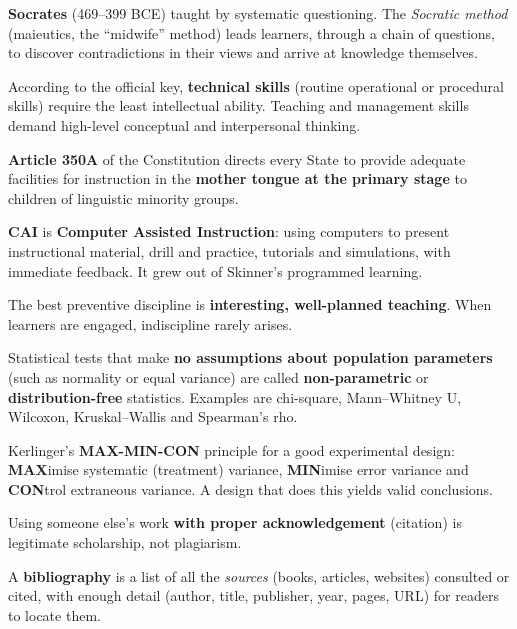 \textbf{Socrates} (469--399 BCE) taught by systematic questioning. The \emph{Socratic method} (maieutics, the ``midwife'' method) leads learners, through a chain of questions, to discover contradictions in their views and arrive at knowledge themselves.

According to the official key, \textbf{technical skills} (routine operational or procedural skills) require the least intellectual ability. Teaching and management skills demand high-level conceptual and interpersonal thinking.

\textbf{Article 350A} of the Constitution directs every State to provide adequate facilities for instruction in the \textbf{mother tongue at the primary stage} to children of linguistic minority groups.

\textbf{CAI} is \textbf{Computer Assisted Instruction}: using computers to present instructional material, drill and practice, tutorials and simulations, with immediate feedback. It grew out of Skinner's programmed learning.

The best preventive discipline is \textbf{interesting, well-planned teaching}. When learners are engaged, indiscipline rarely arises.

Statistical tests that make \textbf{no assumptions about population parameters} (such as normality or equal variance) are called \textbf{non-parametric} or \textbf{distribution-free} statistics. Examples are chi-square, Mann--Whitney U, Wilcoxon, Kruskal--Wallis and Spearman's rho.

Kerlinger's \textbf{MAX-MIN-CON} principle for a good experimental design: \textbf{MAX}imise systematic (treatment) variance, \textbf{MIN}imise error variance and \textbf{CON}trol extraneous variance. A design that does this yields valid conclusions.

Using someone else's work \textbf{with proper acknowledgement} (citation) is legitimate scholarship, not plagiarism.

A \textbf{bibliography} is a list of all the \emph{sources} (books, articles, websites) consulted or cited, with enough detail (author, title, publisher, year, pages, URL) for readers to locate them.

